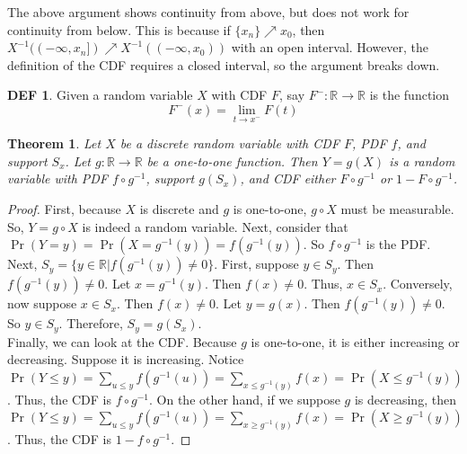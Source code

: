\documentclass{article}
\newtheorem{theorem}{Theorem}
\theoremstyle{definition}\newtheorem{definition}{DEF}
\theoremstyle{definition}\newtheorem{example}{Ex}
\theoremstyle{lemma}\newtheorem{lemma}{Lemma}
\theoremstyle{corrolary}\newtheorem{corrolary}{Cor}
\begin{document}
The above argument shows continuity from above, but does not work for continuity from below.
This is because if $\{x_n\}\nearrow x_0$, then $X^{-1}((-\infty, x_n]) \nearrow X^{-1}((-\infty, x_0))$ with an open interval.
However, the definition of the CDF requires a closed interval, so the argument breaks down.

\begin{definition}
Given a random variable $X$ with CDF $F$, say $F^-: \mathbb{R} \rightarrow \mathbb{R}$ is the function
$$F^- (x) = \lim_{t\to x^-} F(t)$$
\end{definition}

\begin{theorem}
Let $X$ be a discrete random variable with CDF $F$, PDF $f$, and support $S_x$.
Let $g: \mathbb{R} \rightarrow \mathbb{R}$ be a one-to-one function.
Then $Y=g(X)$ is a random variable with PDF $f\circ g^{-1}$, support $g(S_x)$, and CDF either $F\circ g^{-1}$ or $1-F\circ g^{-1}$.
\end{theorem}
\begin{proof}
First, because $X$ is discrete and $g$ is one-to-one, $g\circ X$ must be measurable.
So, $Y=g\circ X$ is indeed a random variable.
Next, consider that $\Pr(Y=y)=\Pr(X=g^{-1}(y))=f(g^{-1}(y))$.
So $f\circ g^{-1}$ is the PDF. \\
Next, $S_y=\{y\in \mathbb{R} | f(g^{-1}(y))\neq 0\}$.
First, suppose $y \in S_y$. Then $f(g^{-1}(y))\neq 0$.
Let $x=g^{-1}(y)$.
Then $f(x)\neq 0$.
Thus, $x\in S_x$.
Conversely, now suppose $x\in S_x$.
Then $f(x)\neq 0$.
Let $y=g(x)$.
Then $f(g^{-1}(y))\neq 0$.
So $y\in S_y$.
Therefore, $S_y=g(S_x)$. \\
Finally, we can look at the CDF.
Because $g$ is one-to-one, it is either increasing or decreasing.
Suppose it is increasing.
Notice $\Pr(Y\leq y)=\sum_{u\leq y}f(g^{-1}(u))=\sum_{x\leq g^{-1}(y)}f(x)=\Pr(X\leq g^{-1}(y))$.
Thus, the CDF is $f\circ g^{-1}$.
On the other hand, if we suppose $g$ is decreasing, then $\Pr(Y\leq y)=\sum_{u\leq y}f(g^{-1}(u))=\sum_{x\geq g^{-1}(y)}f(x)=\Pr(X\geq g^{-1}(y))$.
Thus, the CDF is $1-f\circ g^{-1}$.
\end{proof}
\end{document}
